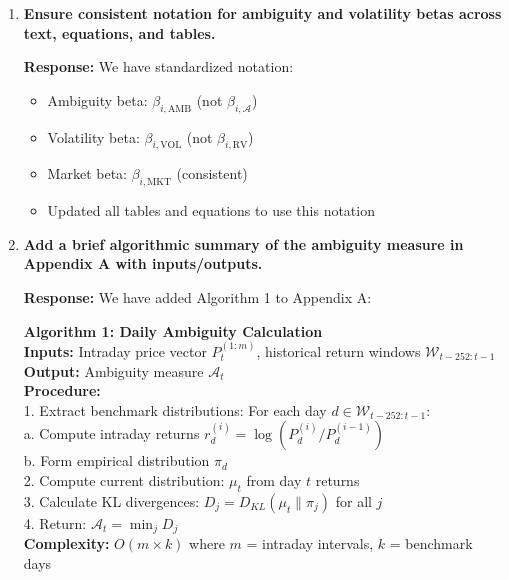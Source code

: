 \documentclass[12pt]{article}
\begin{document}
\begin{enumerate}
    \item \textbf{Ensure consistent notation for ambiguity and volatility betas across text, equations, and tables.}

    \begin{responsebox}
    \textbf{Response:} We have standardized notation:
    \begin{itemize}
        \item Ambiguity beta: $\beta_{i,\text{AMB}}$ (not $\beta_{i,\mathcal{A}}$)
        \item Volatility beta: $\beta_{i,\text{VOL}}$ (not $\beta_{i,\text{RV}}$)
        \item Market beta: $\beta_{i,\text{MKT}}$ (consistent)
        \item Updated all tables and equations to use this notation
    \end{itemize}
    \end{responsebox}

    \item \textbf{Add a brief algorithmic summary of the ambiguity measure in Appendix A with inputs/outputs.}

    \begin{responsebox}
    \textbf{Response:} We have added Algorithm 1 to Appendix A:

    \begin{minipage}{\textwidth}
    \textbf{Algorithm 1: Daily Ambiguity Calculation}\\
    \textbf{Inputs:} Intraday price vector $P_{t}^{(1:m)}$, historical return windows $\mathcal{W}_{t-252:t-1}$\\
    \textbf{Output:} Ambiguity measure $\mathcal{A}_t$\\
    \textbf{Procedure:}\\
    1. Extract benchmark distributions: For each day $d \in \mathcal{W}_{t-252:t-1}$:\\
    \quad a. Compute intraday returns $r^{(i)}_d = \log(P^{(i)}_d/P^{(i-1)}_d)$\\
    \quad b. Form empirical distribution $\pi_d$\\
    2. Compute current distribution: $\mu_t$ from day $t$ returns\\
    3. Calculate KL divergences: $D_j = D_{KL}(\mu_t \| \pi_j)$ for all $j$\\
    4. Return: $\mathcal{A}_t = \min_j D_j$\\
    \textbf{Complexity:} $O(m \times k)$ where $m$ = intraday intervals, $k$ = benchmark days
    \end{minipage}
    \end{responsebox}


\end{enumerate}
\end{document}
